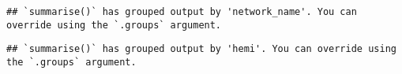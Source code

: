 \documentclass[
]{article}
\newenvironment{Shaded}{\begin{snugshade}}{\end{snugshade}}
\newcommand{\CommentTok}[1]{\textcolor[rgb]{0.56,0.35,0.01}{\textit{#1}}}
\newcommand{\DataTypeTok}[1]{\textcolor[rgb]{0.13,0.29,0.53}{#1}}
\newcommand{\FloatTok}[1]{\textcolor[rgb]{0.00,0.00,0.81}{#1}}
\newcommand{\KeywordTok}[1]{\textcolor[rgb]{0.13,0.29,0.53}{\textbf{#1}}}
\newcommand{\NormalTok}[1]{#1}
\newcommand{\OperatorTok}[1]{\textcolor[rgb]{0.81,0.36,0.00}{\textbf{#1}}}
\newcommand{\StringTok}[1]{\textcolor[rgb]{0.31,0.60,0.02}{#1}}
\begin{document}
\begin{verbatim}
## `summarise()` has grouped output by 'network_name'. You can override using the `.groups` argument.
\end{verbatim}

\begin{Shaded}
\end{Shaded}

\begin{verbatim}
## `summarise()` has grouped output by 'hemi'. You can override using the `.groups` argument.
\end{verbatim}
\end{document}
